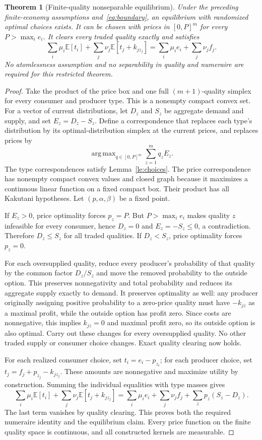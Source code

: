 \documentclass[11pt,a4paper]{article}
\newtheorem{theorem}{Theorem}[section]
\theoremstyle{definition}
\theoremstyle{remark}
\newcommand{\E}{\mathbb E}
\DeclareMathOperator*{\argmax}{arg\,max}
\begin{document}
\begin{theorem}[Finite-quality nonseparable equilibrium]\label{th:exist}
Under the preceding finite-economy assumptions and~\eqref{eq:boundary}, an equilibrium with randomized optimal choices exists. It can be chosen with prices in $[0,P]^m$ for every $P>\max_i e_i$. It clears every traded quality exactly and satisfies
\[
 \sum_i\mu_i\E[t_i]+\sum_j\nu_j\E[t_j+k_{jz_j}]
       =\sum_i\mu_ie_i+\sum_j\nu_jf_j.
\]
No atomlessness assumption and no separability in quality and numeraire are required for this restricted theorem.
\end{theorem}
\begin{proof}
Take the product of the price box and one full $(m+1)$-quality simplex for every consumer and producer type. This is a nonempty compact convex set. For a vector of current distributions, let $D_z$ and $S_z$ be aggregate demand and supply, and set $E_z=D_z-S_z$. Define a correspondence that replaces each type's distribution by its optimal-distribution simplex at the current prices, and replaces prices by
\[
 \argmax_{q\in[0,P]^m}\sum_{z=1}^m q_zE_z.
\]
The type correspondences satisfy Lemma~\ref{le:choices}. The price correspondence has nonempty compact convex values and closed graph because it maximizes a continuous linear function on a fixed compact box. Their product has all Kakutani hypotheses. Let $(p,\alpha,\beta)$ be a fixed point.

If $E_z>0$, price optimality forces $p_z=P$. But $P>\max_i e_i$ makes quality $z$ infeasible for every consumer, hence $D_z=0$ and $E_z=-S_z\leq0$, a contradiction. Therefore $D_z\leq S_z$ for all traded qualities. If $D_z<S_z$, price optimality forces $p_z=0$.

For each oversupplied quality, reduce every producer's probability of that quality by the common factor $D_z/S_z$ and move the removed probability to the outside option. This preserves nonnegativity and total probability and reduces its aggregate supply exactly to demand. It preserves optimality as well: any producer originally assigning positive probability to a zero-price quality must have $-k_{jz}$ as a maximal profit, while the outside option has profit zero. Since costs are nonnegative, this implies $k_{jz}=0$ and maximal profit zero, so its outside option is also optimal. Carry out these changes for every oversupplied quality. No other traded supply or consumer choice changes. Exact quality clearing now holds.

For each realized consumer choice, set $t_i=e_i-p_{z_i}$; for each producer choice, set $t_j=f_j+p_{z_j}-k_{jz_j}$. These amounts are nonnegative and maximize utility by construction. Summing the individual equalities with type masses gives
\[
 \sum_i\mu_i\E[t_i]+\sum_j\nu_j\E[t_j+k_{jz_j}]
 =\sum_i\mu_ie_i+\sum_j\nu_jf_j+\sum_zp_z(S_z-D_z).
\]
The last term vanishes by quality clearing. This proves both the required numeraire identity and the equilibrium claim. Every price function on the finite quality space is continuous, and all constructed kernels are measurable.
\end{proof}
\end{document}
